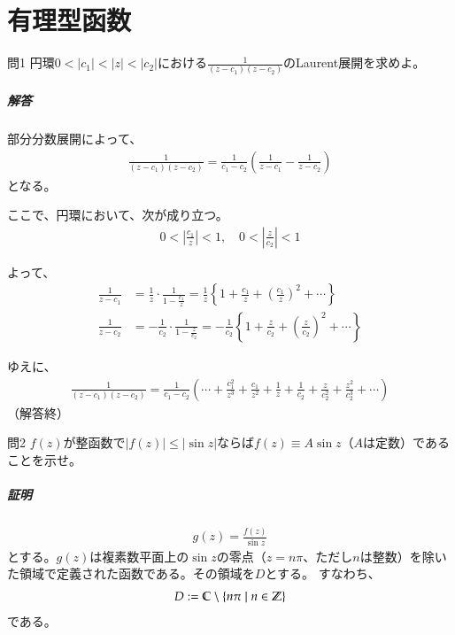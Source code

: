 \chapter{有理型函数}%

\begin{mysimplebox}{問1}
    円環$0<|c_1|<|z|<|c_2|$における$\frac{1}{(z-c_1)(z-c_2)}$のLaurent展開を求めよ。
\end{mysimplebox}
\paragraph{解答}
部分分数展開によって、
\begin{align*}
    \frac{1}{(z-c_1)(z-c_2)}=\frac{1}{c_1-c_2}\left(\frac{1}{z-c_1}-\frac{1}{z-c_2}\right)
\end{align*}
となる。

ここで、円環において、次が成り立つ。
\begin{align*}
    0<\left|\frac{c_1}{z}\right|<1,\quad0<\left|\frac{z}{c_2}\right|<1
\end{align*}

よって、
\begin{align*}
    \frac{1}{z-c_1}
    &=\frac{1}{z}\cdot\frac{1}{1-\frac{c_1}{z}}
    =\frac{1}{z}\left\{1+\frac{c_1}{z}+\left(\frac{c_1}{z}\right)^2+\cdots\right\}\\
    \frac{1}{z-c_2}
    &=-\frac{1}{c_2}\cdot\frac{1}{1-\frac{z}{c_2}}
    =-\frac{1}{c_2}\left\{1+\frac{z}{c_2}+\left(\frac{z}{c_2}\right)^2+\cdots\right\}
\end{align*}

ゆえに、
\begin{align*}
    \frac{1}{(z-c_1)(z-c_2)}
    =\frac{1}{c_1-c_2}\left(\cdots+\frac{c_1^2}{z^3}+\frac{c_1}{z^2}+\frac{1}{z}+\frac{1}{c_2}+\frac{z}{c_2^2}+\frac{z^2}{c_2^3}+\cdots\right)
\end{align*}
（解答終）

\begin{mysimplebox}{問2}
    $f(z)$が整函数で$|f(z)|\le|\sin z|$ならば$f(z)\equiv A\sin z$（$A$は定数）であることを示せ。
\end{mysimplebox}
\paragraph{証明}

\begin{align*}
    g(z)=\frac{f(z)}{\sin z}
\end{align*}
とする。$g(z)$は複素数平面上の$\sin z$の零点（$z=n\pi$、ただし$n$は整数）を除いた領域で定義された函数である。その領域を$D$とする。
すなわち、
\begin{align*}
    D:=\mathbb{C}\setminus\{n\pi\mid n\in\mathbb{Z}\}
\end{align*}
である。


